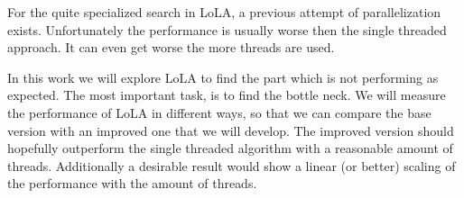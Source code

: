 
For the quite specialized search in LoLA, a previous attempt of parallelization exists. Unfortunately the performance is usually worse then the single threaded approach. It can even get worse the more threads are used.

In this work we will explore LoLA to find the part which is not performing as expected. The most important task, is to find the bottle neck. We will measure the performance of LoLA in different ways, so that we can compare the base version with an improved one that we will develop. The improved version should hopefully outperform the single threaded algorithm with a reasonable amount of threads. Additionally a desirable result would show a linear (or better) scaling of the performance with the amount of threads.


